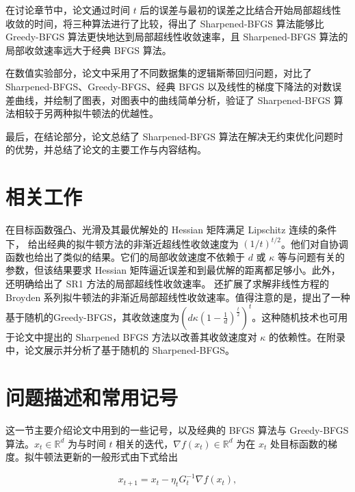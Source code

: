 \documentclass[a4paper,twoside,AutoFakeBold]{article}
\theoremstyle{definition}
\begin{document}
在讨论章节中，论文通过时间 $t$ 后的误差与最初的误差之比结合开始局部超线性收敛的时间，将三种算法进行了比较，得出了 Sharpened-BFGS 算法能够比 Greedy-BFGS 算法更快地达到局部超线性收敛速率，且 Sharpened-BFGS 算法的局部收敛速率远大于经典 BFGS 算法。

在数值实验部分，论文中采用了不同数据集的逻辑斯蒂回归问题，对比了 Sharpened-BFGS、Greedy-BFGS、经典 BFGS 以及线性的梯度下降法的对数误差曲线，并绘制了图表，对图表中的曲线简单分析，验证了 Sharpened-BFGS 算法相较于另两种拟牛顿法的优越性。

最后，在结论部分，论文总结了 Sharpened-BFGS 算法在解决无约束优化问题时的优势，并总结了论文的主要工作与内容结构。

%
\section{相关工作}\label{section:related}
在目标函数强凸、光滑及其最优解处的 Hessian 矩阵满足 Lipschitz 连续的条件下，\citet{qiujian2020quasinewton1} 给出经典的拟牛顿方法的非渐近超线性收敛速度为 $({1}/{t})^{t/2}$。他们对自协调函数也给出了类似的结果。它们的局部收敛速度不依赖于 $d$ 或 $\kappa$ 等与问题有关的参数，但该结果要求 Hessian 矩阵逼近误差和到最优解的距离都足够小。此外，\citet{zhangzhihua2021quasinewton1} 还明确给出了 SR1 方法的局部超线性收敛速率。\citet{zhangzhihua2021quasinewton2} 还扩展了求解非线性方程的 Broyden 系列拟牛顿法的非渐近局部超线性收敛速率。值得注意的是，\citet{zhangzhihua2021quasinewton3}提出了一种基于随机的Greedy-BFGS，其收敛速度为$(d\kappa(1 \!-\! \frac{1}{d})^{\frac{t}{2}})^{t}$。这种随机技术也可用于论文中提出的 Sharpened BFGS 方法以改善其收敛速度对 $\kappa$ 的依赖性。在附录中，论文展示并分析了基于随机的 Sharpened-BFGS。

%
\section{问题描述和常用记号}\label{section:preliminary}
这一节主要介绍论文中用到的一些记号，以及经典的 BFGS 算法与 Greedy-BFGS 算法。$x_t\in \mathbb{R}^d$ 为与时间 $t$ 相关的迭代，$\nabla f(x_t)\in \mathbb{R}^d$ 为在 $x_t$ 处目标函数的梯度。拟牛顿法更新的一般形式由下式给出

\begin{equation}\label{qn_method}
    x_{t + 1} = x_t - \eta_t G_t^{-1} \nabla{f(x_t)},
\end{equation}
\end{document}
